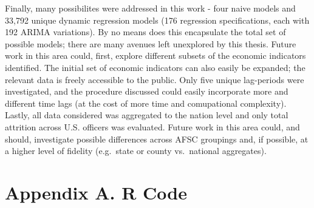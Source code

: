 \documentclass[12pt,letterpaper,toc=flat,oneside]{report}
\theoremstyle{definition}
\theoremstyle{definition}
\theoremstyle{definition}
\theoremstyle{remark}
\begin{document}
Finally, many possibilites were addressed in this work - four naive
models and 33,792 unique dynamic regression models (176 regression
specifications, each with 192 ARIMA variations). By no means does this
encapsulate the total set of possible models; there are many avenues
left unexplored by this thesis. Future work in this area could, first,
explore different subsets of the economic indicators identified. The
initial set of economic indicators can also easily be expanded; the
relevant data is freely accessible to the public. Only five unique
lag-periods were investigated, and the procedure discussed could easily
incorporate more and different time lags (at the cost of more time and
comupational complexity). Lastly, all data considered was aggregated to
the nation level and only total attrition across U.S. officers was
evaluated. Future work in this area could, and should, investigate
possible differences across AFSC groupings and, if possible, at a higher
level of fidelity (e.g.~state or county vs.~national aggregates).

\newpage

\hypertarget{appendix-a.-r-code}{%
\chapter*{Appendix A. R Code}\label{appendix-a.-r-code}}

\tiny
\end{document}
